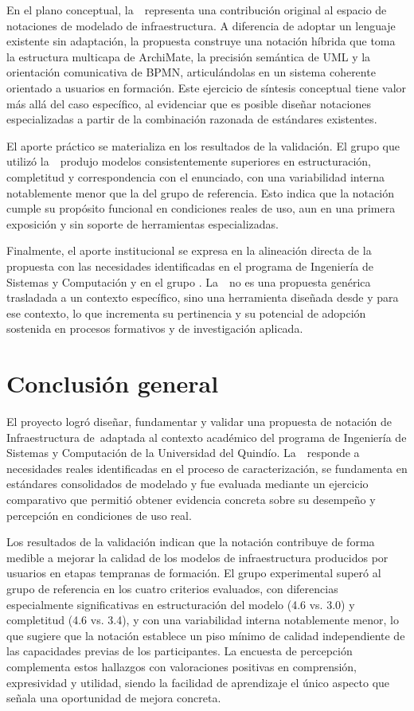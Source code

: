 En el plano conceptual, la~\NDITI~representa una contribución original al espacio de notaciones de modelado de infraestructura. A diferencia de adoptar un lenguaje existente sin adaptación, la propuesta construye una notación híbrida que toma la estructura multicapa de ArchiMate, la precisión semántica de UML y la orientación comunicativa de BPMN, articulándolas en un sistema coherente orientado a usuarios en formación. Este ejercicio de síntesis conceptual tiene valor más allá del caso específico, al evidenciar que es posible diseñar notaciones especializadas a partir de la combinación razonada de estándares existentes.

El aporte práctico se materializa en los resultados de la validación. El grupo que utilizó la~\NDITI~produjo modelos consistentemente superiores en estructuración, completitud y correspondencia con el enunciado, con una variabilidad interna notablemente menor que la del grupo de referencia. Esto indica que la notación cumple su propósito funcional en condiciones reales de uso, aun en una primera exposición y sin soporte de herramientas especializadas.

Finalmente, el aporte institucional se expresa en la alineación directa de la propuesta con las necesidades identificadas en el programa de Ingeniería de Sistemas y Computación y en el grupo \GRID. La~\NDITI~no es una propuesta genérica trasladada a un contexto específico, sino una herramienta diseñada desde y para ese contexto, lo que incrementa su pertinencia y su potencial de adopción sostenida en procesos formativos y de investigación aplicada.

\section{Conclusión general}
\noindent
El proyecto logró diseñar, fundamentar y validar una propuesta de notación de Infraestructura de~\TI adaptada al contexto académico del programa de Ingeniería de Sistemas y Computación de la Universidad del Quindío. La~\NDITI~responde a necesidades reales identificadas en el proceso de caracterización, se fundamenta en estándares consolidados de modelado y fue evaluada mediante un ejercicio comparativo que permitió obtener evidencia concreta sobre su desempeño y percepción en condiciones de uso real.

Los resultados de la validación indican que la notación contribuye de forma medible a mejorar la calidad de los modelos de infraestructura producidos por usuarios en etapas tempranas de formación. El grupo experimental superó al grupo de referencia en los cuatro criterios evaluados, con diferencias especialmente significativas en estructuración del modelo (4.6 vs. 3.0) y completitud (4.6 vs. 3.4), y con una variabilidad interna notablemente menor, lo que sugiere que la notación establece un piso mínimo de calidad independiente de las capacidades previas de los participantes. La encuesta de percepción complementa estos hallazgos con valoraciones positivas en comprensión, expresividad y utilidad, siendo la facilidad de aprendizaje el único aspecto que señala una oportunidad de mejora concreta.

